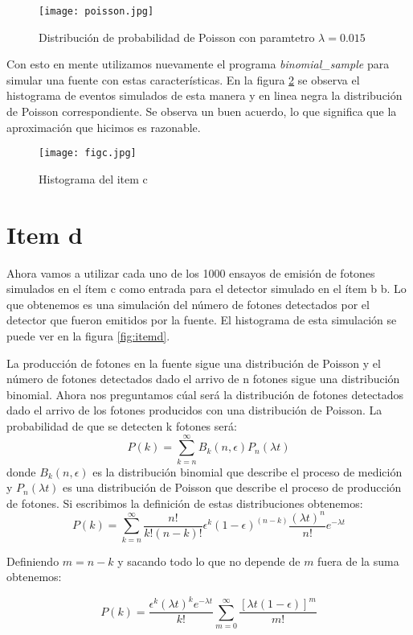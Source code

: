 \documentclass{article}
\begin{document}
\begin{figure}
\centering
\texttt{[image: poisson.jpg]}
\caption[]{Distribución de probabilidad de Poisson con paramtetro $\lambda=0.015$}
\label{fig:poisson}
\end{figure}

Con esto en mente utilizamos nuevamente el programa \textit{binomial\_sample} para simular una fuente con estas características.
En la figura \ref{fig:itemc} se observa el histograma de eventos simulados de esta manera y en linea negra la distribución de Poisson correspondiente. Se observa un buen acuerdo, lo que significa que la aproximación que hicimos es razonable.

\begin{figure}
\centering
\texttt{[image: figc.jpg]}
\caption[]{Histograma del item c}
\label{fig:itemc}
\end{figure}

\section{Item d}
Ahora vamos a utilizar cada uno de los 1000 ensayos de emisión de fotones simulados en el ítem c como entrada para el detector simulado en el ítem b b.
Lo que obtenemos es una simulación del número de fotones detectados por el detector que fueron emitidos por la fuente.
El histograma de esta simulación se puede ver en la figura  \ref{fig:itemd}.

La producción de fotones en la fuente sigue una distribución de Poisson y el número de fotones detectados dado el arrivo de n fotones sigue una distribución binomial.
Ahora nos preguntamos cúal será la distribución de fotones detectados dado el arrivo de los fotones producidos con una distribución de Poisson.
La probabilidad de que se detecten k fotones será:
$$
P(k) = \sum_{k=n}^{\infty} B_k(n, \epsilon) P_n(\lambda t)
$$
donde $B_k(n, \epsilon)$ es la distribución binomial que describe el proceso de medición y $P_n(\lambda t)$ es una distribución de Poisson que describe el proceso de producción de fotones.
Si escribimos la definición de estas distribuciones obtenemos:
$$
P(k) = \sum_{k=n}^{\infty} \frac{n!}{k!(n-k)!}\epsilon^k (1- \epsilon)^(n-k) \frac{(\lambda t)^n}{n!}e^{-\lambda t}
$$

Definiendo $m=n-k$ y sacando todo lo que no depende de $m$ fuera de la suma obtenemos:

$$
P(k) = \frac{\epsilon^k (\lambda t)^k e^{-\lambda t}}{k!} \sum_{m=0}^{\infty} \frac{[\lambda t(1- \epsilon)]^m}{m!}
$$
\end{document}
